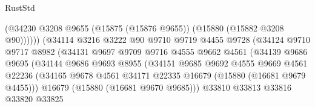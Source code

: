\begin{lexlean}{RustStd}
\begin{coremodule}
                                        (@34230
                                          @3208
                                          @9655
                                          (@15875 (@15876 @9655))
                                          (@15880 (@15882 @3208 @90))))))
                                  (@34114
                                    @3216
                                    @3222
                                    @90
                                    @9710
                                    @9719
                                    @4455
                                    @9728
                                    (@34124
                                      @9710
                                      @9717
                                      @8982
                                      (@34131
                                        @9697
                                        @9709
                                        @9716
                                        @4555
                                        @9662
                                        @4561
                                        (@34139
                                          @9686
                                          @9695
                                          (@34144
                                            @9686
                                            @9693
                                            @8955
                                            (@34151
                                              @9685
                                              @9692
                                              @4555
                                              @9669
                                              @4561
                                              @22236
                                              (@34165
                                                @9678
                                                @4561
                                                @34171
                                                @22335
                                                @16679
                                                (@15880 (@16681 @9679 @4455)))
                                              @16679
                                              (@15880 (@16681 @9670 @9685)))
                                            @33810
                                            @33813
                                            @33816
                                            @33820
                                            @33825

\end{coremodule}
\end{lexlean}
